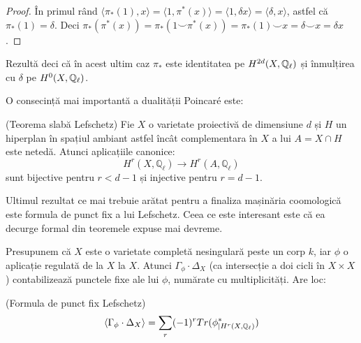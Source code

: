 \documentclass[13pt,openany,oneside]{book}
\begin{document}
\begin{proof}
În primul rând $\langle \pi_*(1),x\rangle = \langle1,\pi^*(x)\rangle = \langle1,\delta x\rangle = \langle \delta,x\rangle$, astfel că $\pi_*(1)=\delta$.
Deci $\pi_*(\pi^*(x)) = \pi_*(1 \smile \pi^*(x)) = \pi_*(1) \smile x = \delta \smile x = \delta x$.
\end{proof}
Rezultă deci că în acest ultim caz $\pi_*$ este identitatea pe $H^{2d}(X,\mathbb{Q}_\ell)$ și înmulțirea cu $\delta$ pe $H^0(X,\mathbb{Q}_\ell)$.

O consecință mai importantă a dualității Poincaré este:

\begin{teo}
(Teorema slabă Lefschetz) Fie $X$ o varietate proiectivă de dimensiune $d$ și $H$ un hiperplan în spațiul ambiant astfel încât complementara în $X$ a lui $A = X \cap H$ este netedă. Atunci aplicațiile canonice:
$$H^r(X,\mathbb{Q}_\ell) \rightarrow H^r(A,\mathbb{Q}_\ell)$$
sunt bijective pentru $r < d-1$ și injective pentru $r=d-1$.
\end{teo}

Ultimul rezultat ce mai trebuie arătat pentru a finaliza mașinăria coomologică este formula de punct fix a lui Lefschetz. Ceea ce este interesant este că ea decurge formal din teoremele expuse mai devreme.

Presupunem că $X$ este o varietate completă nesingulară peste un corp $k$, iar $\phi$ o aplicație regulată de la $X$ la $X$. Atunci $\Gamma_\phi \cdot \Delta_X$ (ca intersecție a doi cicli în $X \times X$) contabilizează punctele fixe ale lui $\phi$, numărate cu multiplicități. Are loc:

\begin{teo}
(Formula de punct fix Lefschetz)
$$\langle \Gamma_\phi \cdot \Delta_X \rangle = \sum\limits_r (-1)^r Tr(\phi^*_{\mid H^r(X,\mathbb{Q}_\ell)})$$
\end{teo}
\end{document}
